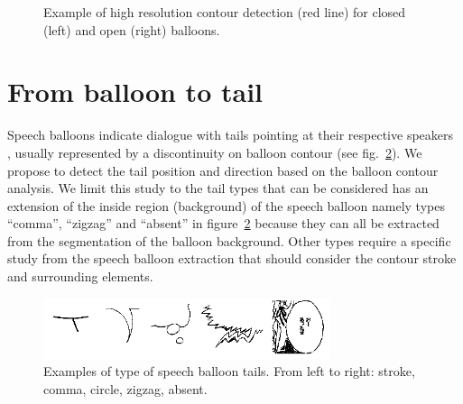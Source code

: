 
	\begin{figure}[!ht]	%
	  \centering
		\caption{Example of high resolution contour detection (red line) for closed (left) and open (right) balloons.}
		\label{fig:se:se:hd_contour}
	\end{figure}



\section{From balloon to tail} %
\label{sec:from_balloon_to_tail}

Speech balloons indicate dialogue with tails pointing at their respective speakers~\cite{Varnum2007Language}
, usually represented by a discontinuity on balloon contour (see fig.~\ref{fig:se:tail_types}). 
We propose to detect the tail position and direction based on the balloon contour analysis.
We limit this study to the tail types that can be considered has an extension of the inside region (background) of the speech balloon namely types ``comma'', ``zigzag'' and ``absent'' in figure~\ref{fig:se:tail_types} because they can all be extracted from the segmentation of the balloon background.
Other types require a specific study from the speech balloon extraction that should consider the contour stroke and surrounding elements.

    \begin{figure}[ht]%
      \centering
      \includegraphics[trim= 0px 0px 0mm 0mm, clip, width=0.75\textwidth]{tail_types.png}
    \caption{Examples of type of speech balloon tails. From left to right: stroke, comma, circle, zigzag, absent.}
    \label{fig:se:tail_types}
    \end{figure}

